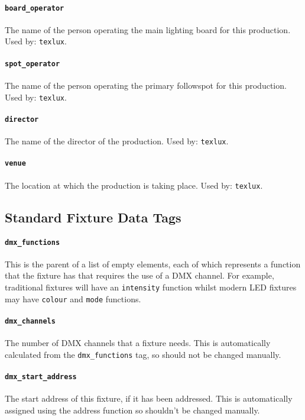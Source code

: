 \documentclass[a4paper]{article}
\begin{document}
\paragraph{\texttt{board\_operator}}
The name of the person operating the main lighting board for this production.
Used by: \texttt{texlux}.

\paragraph{\texttt{spot\_operator}}
The name of the person operating the primary followspot for this production.
Used by: \texttt{texlux}.

\paragraph{\texttt{director}}
The name of the director of the production. Used by: \texttt{texlux}.

\paragraph{\texttt{venue}}
The location at which the production is taking place. Used by: 
\texttt{texlux}.

\subsection{Standard Fixture Data Tags} \label{sec:fixtags}

\paragraph{\texttt{dmx\_functions}}
This is the parent of a list of empty elements, each of which represents a 
function that the fixture has that requires the use of a DMX channel. For 
example, traditional fixtures will have an \texttt{intensity} function 
whilst modern LED fixtures may have \texttt{colour} and \texttt{mode} 
functions.

\paragraph{\texttt{dmx\_channels}}
The number of DMX channels that a fixture needs. This is automatically 
calculated from the \texttt{dmx\_functions} tag, so should not be changed 
manually.

\paragraph{\texttt{dmx\_start\_address}}
The start address of this fixture, if it has been addressed. This is 
automatically assigned using the address function so shouldn't be changed 
manually.
\end{document}
